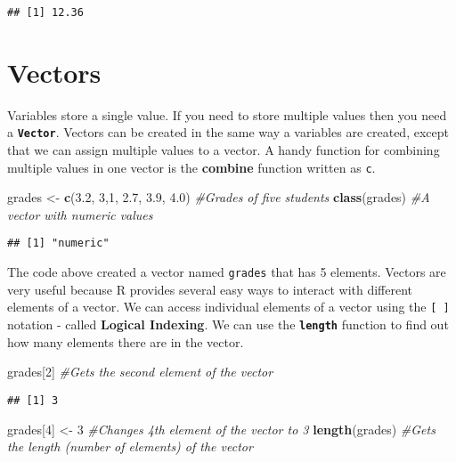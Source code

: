 \documentclass[
]{krantz}
\makeatletter
\newenvironment{Shaded}{\begin{snugshade}}{\end{snugshade}}
\newcommand{\CommentTok}[1]{\textcolor[rgb]{0.37,0.37,0.37}{\textit{#1}}}
\newcommand{\DecValTok}[1]{\textcolor[rgb]{0.06,0.06,0.06}{#1}}
\newcommand{\FloatTok}[1]{\textcolor[rgb]{0.06,0.06,0.06}{#1}}
\newcommand{\KeywordTok}[1]{\textcolor[rgb]{0.27,0.27,0.27}{\textbf{#1}}}
\newcommand{\NormalTok}[1]{#1}
\newcommand{\StringTok}[1]{\textcolor[rgb]{0.5,0.5,0.5}{#1}}
\newenvironment{kframe}{%
\medskip{}
\setlength{\fboxsep}{.8em}
 \def\at@end@of@kframe{}%
 \ifinner\ifhmode%
  \def\at@end@of@kframe{\end{minipage}}%
  \begin{minipage}{\columnwidth}%
 \fi\fi%
 \def\FrameCommand##1{\hskip\@totalleftmargin \hskip-\fboxsep
 \colorbox{shadecolor}{##1}\hskip-\fboxsep
     \hskip-\linewidth \hskip-\@totalleftmargin \hskip\columnwidth}%
 \MakeFramed {\advance\hsize-\width
   \@totalleftmargin\z@ \linewidth\hsize
   \@setminipage}}%
 {\par\unskip\endMakeFramed%
 \at@end@of@kframe}
\renewenvironment{Shaded}{\begin{kframe}}{\end{kframe}}
\makeatother
\begin{document}
\begin{verbatim}
## [1] 12.36
\end{verbatim}

\hypertarget{vectors}{%
\section{Vectors}\label{vectors}}

Variables store a single value. If you need to store multiple values then you need a \textbf{\texttt{Vector}}. Vectors can be created in the same way a variables are created, except that we can assign multiple values to a vector. A handy function for combining multiple values in one vector is the \textbf{combine} function written as \texttt{c}.

\begin{Shaded}
\begin{Highlighting}[]
\NormalTok{grades <-}\StringTok{ }\KeywordTok{c}\NormalTok{(}\FloatTok{3.2}\NormalTok{, }\DecValTok{3}\NormalTok{,}\DecValTok{1}\NormalTok{, }\FloatTok{2.7}\NormalTok{, }\FloatTok{3.9}\NormalTok{, }\FloatTok{4.0}\NormalTok{) }\CommentTok{#Grades of five students}
\KeywordTok{class}\NormalTok{(grades) }\CommentTok{#A vector with numeric values}
\end{Highlighting}
\end{Shaded}

\begin{verbatim}
## [1] "numeric"
\end{verbatim}

The code above created a vector named \texttt{grades} that has 5 elements. Vectors are very useful because R provides several easy ways to interact with different elements of a vector. We can access individual elements of a vector using the \texttt{{[}\ {]}} notation - called \textbf{Logical Indexing}. We can use the \textbf{\texttt{length}} function to find out how many elements there are in the vector.

\begin{Shaded}
\begin{Highlighting}[]
\NormalTok{grades[}\DecValTok{2}\NormalTok{] }\CommentTok{#Gets the second element of the vector}
\end{Highlighting}
\end{Shaded}

\begin{verbatim}
## [1] 3
\end{verbatim}

\begin{Shaded}
\begin{Highlighting}[]
\NormalTok{grades[}\DecValTok{4}\NormalTok{] <-}\StringTok{ }\DecValTok{3} \CommentTok{#Changes 4th element of the vector to 3}
\KeywordTok{length}\NormalTok{(grades) }\CommentTok{#Gets the length (number of elements) of the vector}
\end{Highlighting}
\end{Shaded}
\end{document}
